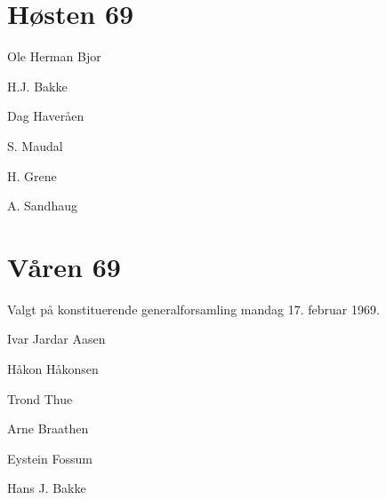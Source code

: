 \section*{Høsten 69}

\begin{description}
	\item[Leder] Ole Herman Bjor
	\item[Nestleder] H.J. Bakke
	\item[Sekretær] Dag Haveråen
	\item[Kasserer] S. Maudal
	\item H. Grene
	\item A. Sandhaug
\end{description}

\section*{Våren 69}

Valgt på konstituerende generalforsamling mandag 17. februar 1969.

\begin{description}
	\item[Leder] Ivar Jardar Aasen
	\item Håkon Håkonsen
	\item Trond Thue
	\item Arne Braathen
	\item Eystein Fossum
	\item Hans J. Bakke
\end{description}
